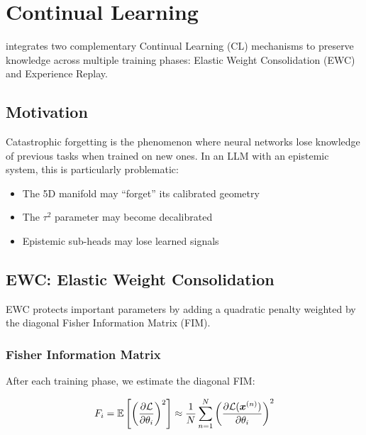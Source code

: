 
\section{Continual Learning}
\label{sec:continual}

\aletheion{} integrates two complementary Continual Learning (CL)
mechanisms to preserve knowledge across multiple training phases:
Elastic Weight Consolidation (EWC) and Experience Replay.

\subsection{Motivation}

Catastrophic forgetting \cite{mccloskey1989catastrophic} is the
phenomenon where neural networks lose knowledge of previous tasks
when trained on new ones. In an LLM with an epistemic system, this is
particularly problematic:

\begin{itemize}
    \item The 5D manifold may ``forget'' its calibrated geometry
    \item The $\tau^2$ parameter may become decalibrated
    \item Epistemic sub-heads may lose learned signals
\end{itemize}

\subsection{EWC: Elastic Weight Consolidation}
\label{sec:ewc}

EWC \cite{kirkpatrick2017ewc} protects important parameters by adding
a quadratic penalty weighted by the diagonal Fisher Information Matrix
(FIM).

\subsubsection{Fisher Information Matrix}

After each training phase, we estimate the diagonal FIM:

\begin{equation}
    F_i = \mathbb{E}\left[\left(\frac{\partial \mathcal{L}}{\partial \theta_i}\right)^2\right]
    \approx \frac{1}{N} \sum_{n=1}^{N} \left(\frac{\partial \mathcal{L}(\bm{x}^{(n)})}{\partial \theta_i}\right)^2
    \label{eq:fisher}
\end{equation}

